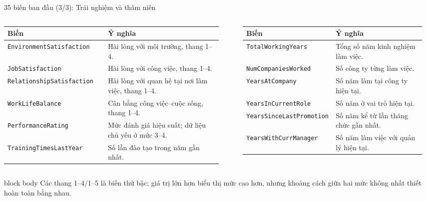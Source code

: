 \documentclass[10pt,aspectratio=169]{beamer}
\begin{document}
\begin{frame}{35 biến ban đầu (3/3): Trải nghiệm và thâm niên}
  \scriptsize
  \renewcommand{\arraystretch}{1.10}
  \begin{columns}[T,onlytextwidth]
    \begin{column}{0.49\textwidth}
      \begin{tabular}{>{\raggedright\arraybackslash}p{0.44\linewidth}
                      >{\raggedright\arraybackslash}p{0.50\linewidth}}
        \toprule
        \textbf{Biến} & \textbf{Ý nghĩa}\\
        \midrule
        \texttt{EnvironmentSatisfaction} & Hài lòng với môi trường, thang 1--4.\\
        \texttt{JobSatisfaction} & Hài lòng với công việc, thang 1--4.\\
        \texttt{RelationshipSatisfaction} & Hài lòng với quan hệ tại nơi làm việc, thang 1--4.\\
        \texttt{WorkLifeBalance} & Cân bằng công việc--cuộc sống, thang 1--4.\\
        \texttt{PerformanceRating} & Mức đánh giá hiệu suất; dữ liệu chủ yếu ở mức 3--4.\\
        \texttt{TrainingTimesLastYear} & Số lần đào tạo trong năm gần nhất.\\
        \bottomrule
      \end{tabular}
    \end{column}
    \begin{column}{0.49\textwidth}
      \begin{tabular}{>{\raggedright\arraybackslash}p{0.44\linewidth}
                      >{\raggedright\arraybackslash}p{0.50\linewidth}}
        \toprule
        \textbf{Biến} & \textbf{Ý nghĩa}\\
        \midrule
        \texttt{TotalWorkingYears} & Tổng số năm kinh nghiệm làm việc.\\
        \texttt{NumCompaniesWorked} & Số công ty từng làm việc.\\
        \texttt{YearsAtCompany} & Số năm làm tại công ty hiện tại.\\
        \texttt{YearsInCurrentRole} & Số năm ở vai trò hiện tại.\\
        \texttt{YearsSinceLastPromotion} & Số năm kể từ lần thăng chức gần nhất.\\
        \texttt{YearsWithCurrManager} & Số năm làm việc với quản lý hiện tại.\\
        \bottomrule
      \end{tabular}
    \end{column}
  \end{columns}

  \vspace{0.24cm}
  \begin{beamercolorbox}[sep=0.13cm,rounded=true]{block body}
    \centering\small
    Các thang 1--4/1--5 là biến thứ bậc; giá trị lớn hơn biểu thị mức cao
    hơn, nhưng khoảng cách giữa hai mức không nhất thiết hoàn toàn bằng nhau.
  \end{beamercolorbox}
\end{frame}
\end{document}
